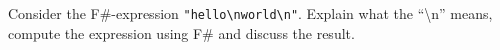 Consider the F\#-expression \lstinline{"hello\nworld\n"}. Explain what the ``\textbackslash n'' means, compute the expression using F\# and discuss the result.
